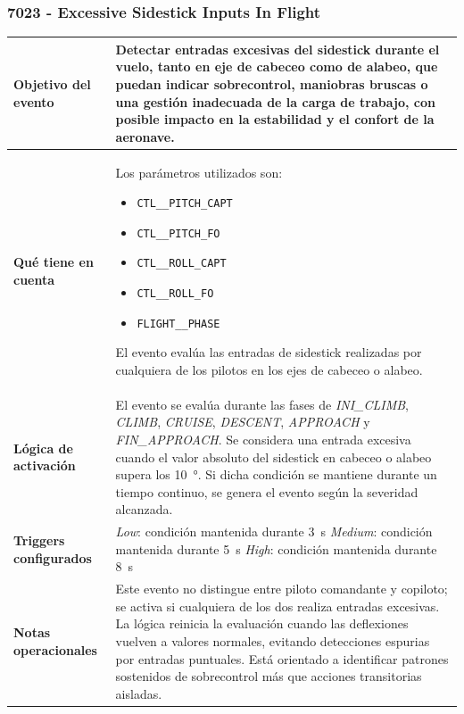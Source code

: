 \documentclass[11pt,a4paper]{article}
\begin{document}
	\subsubsection{7023 - Excessive Sidestick Inputs In Flight}
	\begin{table}[H]
		\centering
		\renewcommand{\arraystretch}{1.3}
		\begin{tabular}{p{5cm} p{9.5cm}}
			\hline
			\textbf{Objetivo del evento} &
			Detectar entradas excesivas del sidestick durante el vuelo, tanto en eje de cabeceo como de alabeo, que puedan indicar sobrecontrol, maniobras bruscas o una gestión inadecuada de la carga de trabajo, con posible impacto en la estabilidad y el confort de la aeronave. \\
			\hline
			\textbf{Qué tiene en cuenta} &
			Los parámetros utilizados son:
			\begin{itemize}
				\item \texttt{CTL\_\_PITCH\_CAPT}
				\item \texttt{CTL\_\_PITCH\_FO}
				\item \texttt{CTL\_\_ROLL\_CAPT}
				\item \texttt{CTL\_\_ROLL\_FO}
				\item \texttt{FLIGHT\_\_PHASE}
			\end{itemize}
			El evento evalúa las entradas de sidestick realizadas por cualquiera de los pilotos en los ejes de cabeceo o alabeo. \\
			\hline
			\textbf{Lógica de activación} &
			El evento se evalúa durante las fases de \textit{INI\_CLIMB}, \textit{CLIMB}, \textit{CRUISE}, \textit{DESCENT}, \textit{APPROACH} y \textit{FIN\_APPROACH}.  
			Se considera una entrada excesiva cuando el valor absoluto del sidestick en cabeceo o alabeo supera los \SI{10} {\degree}.  
			Si dicha condición se mantiene durante un tiempo continuo, se genera el evento según la severidad alcanzada. \\
			\hline
			\textbf{Triggers configurados} &
			\textit{Low}: condición mantenida durante \SI{3}{s} \newline
			\textit{Medium}: condición mantenida durante \SI{5}{s} \newline
			\textit{High}: condición mantenida durante \SI{8}{s} \\
			\hline
			\textbf{Notas operacionales} &
			Este evento no distingue entre piloto comandante y copiloto; se activa si cualquiera de los dos realiza entradas excesivas.  
			La lógica reinicia la evaluación cuando las deflexiones vuelven a valores normales, evitando detecciones espurias por entradas puntuales.  
			Está orientado a identificar patrones sostenidos de sobrecontrol más que acciones transitorias aisladas. \\
			\hline
		\end{tabular}
	\end{table}
	
\end{document}
